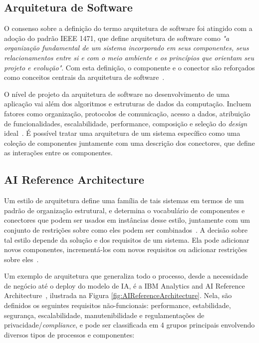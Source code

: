 \documentclass[portugues]{ic-tese}
\begin{document}
\subsection{Arquitetura de Software}

O consenso sobre a definição do termo arquitetura de software foi atingido com a adoção do padrão IEEE 1471, que define arquitetura de software como \textit{"a organização fundamental de um sistema incorporado em seus componentes, seus relacionamentos entre si e com o meio ambiente e os princípios que orientam seu projeto e evolução"}. Com esta definição, o componente e o conector são reforçados como conceitos centrais da arquitetura de software~\citep{Bosch_2004}.

O nível de projeto da arquitetura de software no desenvolvimento de uma aplicação vai além dos algoritmos e estruturas de dados da computação. Incluem fatores como organização, protocolos de comunicação, acesso a dados, atribuição de funcionalidades, escalabilidade, performance, composição e seleção do \textit{design} ideal~\citep{Garlan_1993}. É possível tratar uma arquitetura de um sistema específico como uma coleção de componentes juntamente com uma descrição dos conectores, que define as interações entre os componentes.

\subsection{AI Reference Architecture}

Um estilo de arquitetura define uma família de tais sistemas em termos de um padrão de organização estrutural, e determina o vocabulário de componentes e conectores que podem ser usados em instâncias desse estilo, juntamente com um conjunto de restrições sobre como eles podem ser combinados~\citep{Garlan_1993}. A decisão sobre tal estilo depende da solução e dos requisitos de um sistema. Ela pode adicionar novos componentes, incrementá-los com novos requisitos ou adicionar restrições sobre eles~\citep{Bosch_2004}.

Um exemplo de arquitetura que generaliza todo o processo, desde a necessidade de negócio até o deploy do modelo de IA, é a IBM Analytics and AI Reference Architecture~\citep{IBM_2021}, ilustrada na Figura \ref{fig:AIReferenceArchitecture}. Nela, são definidos os seguintes requisitos não-funcionais: performance, estabilidade, segurança, escalabilidade, manutenibilidade e regulamentações de privacidade/\textit{compliance}, e pode ser classificada em 4 grupos principais envolvendo diversos tipos de processos e componentes:
\end{document}
